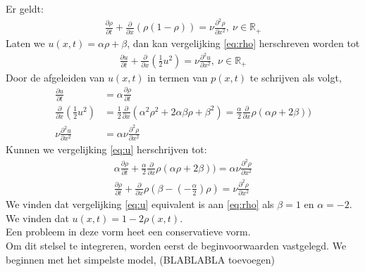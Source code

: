 \documentclass{article}
\begin{document}
Er geldt:
\begin{align}
	\frac{\partial \rho}{\partial t}+\frac{\partial}{\partial x}(\rho(1-\rho))=\nu \frac{\partial^2 \rho}{\partial x^2},~\nu\in \mathbb{R}_+ \label{eq:rho}
	\end{align}
Laten we \(u(x,t)=\alpha\rho + \beta\), dan kan vergelijking \eqref{eq:rho} herschreven worden tot
	\begin{align}
 \frac{\partial u}{\partial t}+\frac{\partial}{\partial x}\left(\frac{1}{2}u^2\right) = \nu \frac{\partial^2 u}{\partial x^2},~\nu\in \mathbb{R}_+\label{eq:u}
\end{align}
Door de afgeleiden van \(u(x,t)\) in termen van \(p(x,t)\) te schrijven als volgt,
\begin{align*}
 \frac{\partial u}{\partial t} &=\alpha\frac{\partial \rho}{\partial t}\\
\frac{\partial}{\partial x}\left(\frac{1}{2}u^2\right)&=\frac{1}{2}\frac{\partial}{\partial x}(\alpha^2\rho^2 +2\alpha\beta\rho+\beta^2)= \frac{\alpha}{2}\frac{\partial}{\partial x}\rho(\alpha\rho+2\beta))\\
\nu \frac{\partial^2 u}{\partial x^2}&=\alpha \nu\frac{\partial^2 \rho}{\partial x^2}
\end{align*}
Kunnen we vergelijking \eqref{eq:u} herschrijven tot:
\begin{align*}
	\alpha\frac{\partial \rho}{\partial t}+\frac{\alpha}{2}\frac{\partial}{\partial x}\rho(\alpha\rho+2\beta))=\alpha \nu\frac{\partial^2 \rho}{\partial x^2}\\
		\frac{\partial \rho}{\partial t}+\frac{\partial}{\partial x}\rho(\beta-(-\frac{\alpha}{2})\rho)=\nu\frac{\partial^2 \rho}{\partial x^2}
\end{align*}
We vinden dat vergelijking   \eqref{eq:u} equivalent is aan \eqref{eq:rho} als \(\beta=1\) en \(\alpha=-2\). We vinden dat \(u(x,t)=1-2\rho(x,t)\).\\
Een probleem in deze vorm heet  een conservatieve vorm. \\

Om dit stelsel te integreren, worden eerst de beginvoorwaarden vastgelegd. We beginnen met het simpelste model, (BLABLABLA toevoegen)
\end{document}

